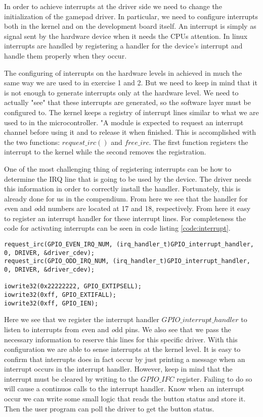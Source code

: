 In order to achieve interrupts at the driver side we need to change the initialization of the gamepad driver. In particular, we need to configure interrupts both in the kernel and on the development board itself. An interrupt is simply as signal sent by the hardware device when it needs the CPUs attention. In linux interrupts are handled by registering a handler for the device's interrupt and handle them properly when they occur. 

The configuring of interrupts on the hardware levels in achieved in much the same way we are used to 
in exercise 1 and 2. But we need to keep in mind that it is not enough to generate interrupts only at the hardware level. We need to actually "see" that these interrupts are generated, so the software layer must be configured to. The kernel keeps a registry of interrupt lines similar to what we are used to in the microcontroller. "A module is expected to request an interrupt channel before using it and to release it when finished. This is accomplished with the two functions: $request\_irc()$ and $free\_irc$. The first function registers the interrupt to the kernel while the second removes the registration. 

One of the most challenging thing of registering interrupts can be how to determine the IRQ line that is going to be used by the device. The driver needs this information in order to correctly install the handler. Fortunately, this is already done for us in the compendium. From here we see that the handler for {\emph even} and {\emph odd} numbers are located at 17 and 18, respectively. From here it easy to register an interrupt handler for these interrupt lines. For completeness the code for activating interrupts can be seen in code listing \ref{code:interrupt}.

\begin{lstlisting}[caption=Activate interupts, label=code:interrupt]
request_irc(GPIO_EVEN_IRQ_NUM, (irq_handler_t)GPIO_interrupt_handler, 0, DRIVER, &driver_cdev);
request_irc(GPIO_ODD_IRQ_NUM, (irq_handler_t)GPIO_interrupt_handler, 0, DRIVER, &driver_cdev);

iowrite32(0x22222222, GPIO_EXTIPSELL);
iowrite32(0xff, GPIO_EXTIFALL);
iowrite32(0xff, GPIO_IEN);
\end{lstlisting}



Here we see that we register the interrupt handler $GPIO\_interrupt\_handler$ to listen to interrupts from {\emph even} and {\emph odd} pins. We also see that we pass the necessary information to reserve this lines for this specific driver. With this configuration we are able to sense interrupts at the kernel level. It is easy to confirm that interrupts does in fact occur by just printing a message when an interrupt occurs in the interrupt handler. However, keep in mind that the interrupt must be cleared by writing to the $GPIO\_IFC$ register. Failing to do so will cause a continuos calls to the interrupt handler. Know when an interrupt occur we can write some small logic that reads the button status and store it. Then the user program can poll the driver to get the button status. 


